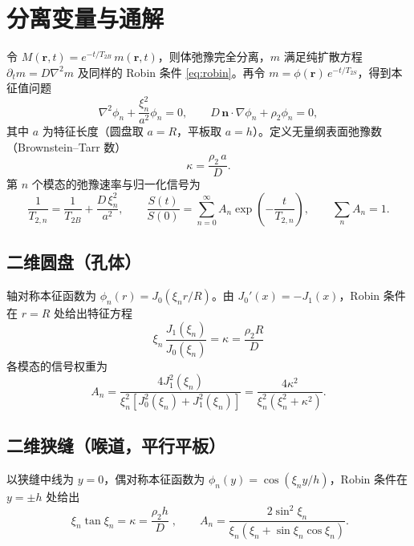 \documentclass[11pt,a4paper]{article}
\newcommand{\TB}{T_{2B}}
\newcommand{\Ts}{T_{2S}}
\begin{document}
\section{分离变量与通解}

令 $M(\bm r,t)=e^{-t/\TB}\,m(\bm r,t)$，则体弛豫完全分离，$m$ 满足纯扩散方程 $\partial_t m=D\nabla^2 m$
及同样的 Robin 条件 \eqref{eq:robin}。再令 $m=\phi(\bm r)\,e^{-t/\Ts}$，得到本征值问题
\begin{equation}
\nabla^{2}\phi_n+\frac{\xi_n^{2}}{a^{2}}\phi_n=0,\qquad
D\,\bm n\cdot\nabla\phi_n+\rho_2\phi_n=0,
\label{eq:eig}
\end{equation}
其中 $a$ 为特征长度（圆盘取 $a=R$，平板取 $a=h$）。定义无量纲表面弛豫数（Brownstein–Tarr 数）
\begin{equation}
\kappa=\frac{\rho_2\,a}{D}.
\end{equation}
第 $n$ 个模态的弛豫速率与归一化信号为\citep{BrownsteinTarr1979,Grebenkov2007}
\begin{equation}
\frac{1}{T_{2,n}}=\frac{1}{\TB}+\frac{D\,\xi_n^{2}}{a^{2}},\qquad
\frac{S(t)}{S(0)}=\sum_{n=0}^{\infty}A_n\exp\!\left(-\frac{t}{T_{2,n}}\right),\qquad \sum_n A_n=1 .
\label{eq:modes}
\end{equation}

\subsection{二维圆盘（孔体）}

轴对称本征函数为 $\phi_n(r)=J_0(\xi_n r/R)$。由 $J_0'(x)=-J_1(x)$，Robin 条件在 $r=R$ 处给出特征方程
\begin{equation}
\boxed{\;\xi_n\,\frac{J_1(\xi_n)}{J_0(\xi_n)}=\kappa=\frac{\rho_2 R}{D}\;}
\label{eq:disk}
\end{equation}
各模态的信号权重为\citep{BrownsteinTarr1979,CarslawJaeger1959}
\begin{equation}
A_n=\frac{4J_1^{2}(\xi_n)}{\xi_n^{2}\left[J_0^{2}(\xi_n)+J_1^{2}(\xi_n)\right]}
=\frac{4\kappa^{2}}{\xi_n^{2}\left(\xi_n^{2}+\kappa^{2}\right)} .
\end{equation}

\subsection{二维狭缝（喉道，平行平板）}

以狭缝中线为 $y=0$，偶对称本征函数为 $\phi_n(y)=\cos(\xi_n y/h)$，Robin 条件在 $y=\pm h$ 处给出
\begin{equation}
\boxed{\;\xi_n\tan\xi_n=\kappa=\frac{\rho_2 h}{D}\;},\qquad
A_n=\frac{2\sin^{2}\xi_n}{\xi_n\left(\xi_n+\sin\xi_n\cos\xi_n\right)} .
\label{eq:slab}
\end{equation}
\end{document}
